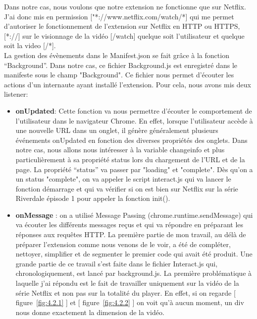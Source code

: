 \documentclass[a4paper, 12pt]{report}
\begin{document}
Dans notre cas, nous voulons que notre extension ne fonctionne que sur Netflix. J’ai donc mis en permission ["*://www.netflix.com/watch/*] qui me permet d’autoriser le fonctionnement de l’extension sur Netflix en HTTP ou HTTPS,[*://] sur le visionnage de la vidéo [/watch] quelque soit l’utilisateur et quelque soit la video [/*].\\
La gestion des évènements dans le Manifest.json se fait grâce à la fonction “Background”. Dans notre cas, ce fichier Background.js est enregistré dans le manifeste sous le champ "Background". Ce fichier nous permet d’écouter les actions d’un internaute ayant installé l’extension. Pour cela, nous avons mis deux listener:
\begin{itemize}
\item \textbf{onUpdated}: Cette fonction va nous permettre d’écouter le comportement de l’utilisateur dans le navigateur Chrome. En effet, lorsque l'utilisateur accède à une nouvelle URL dans un onglet, il génère généralement plusieurs événements onUpdated en fonction des diverses propriétés des onglets. Dans notre cas, nous allons nous intéresser à la variable changeinfo et plus particulièrement à sa propriété status lors du chargement de l’URL et de la page.  La propriété “status” va passer par "loading" et "complete". Dès qu’on a un status "complete", on  va appeler le script interact.js qui va lancer le fonction démarrage et qui va vérifier si on est bien sur Netflix sur la série Riverdale épisode 1 pour appeler la fonction init().
\item \textbf{onMessage} : on a utilisé Message Passing (chrome.runtime.sendMessage) qui va écouter les différents messages reçus et qui va répondre en préparant les réponses aux requêtes HTTP. 
La première partie de mon travail, au délà de préparer l’extension comme nous venons de le voir, a été de compléter, nettoyer, simplifier et de segmenter le premier code qui avait été produit. Une grande partie de ce travail s’est faite dans le fichier Interact.js qui, chronologiquement, est lancé par background.js. 
La première problématique à laquelle j’ai répondu est le fait de travailler uniquement sur la vidéo de la série Netflix et non pas sur la totalité du player. En effet, si on regarde [ figure~\ref{fig:4.2.1} ] et [ figure~\ref{fig:4.2.2} ] on voit qu’à aucun moment, un div nous donne exactement la dimension de la vidéo. \\
\end{itemize} 
\end{document}
